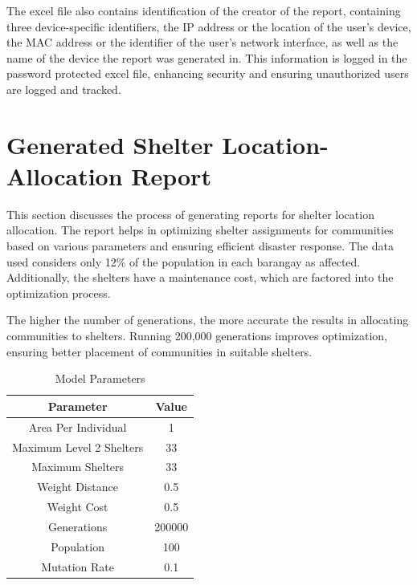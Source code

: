 	The excel file also contains identification of the creator of the report, containing three device-specific identifiers, the IP address or the location of the user’s device, the MAC address or the identifier of the user’s network interface, as well as the name of the device the report was generated in. This information is logged in the password protected excel file, enhancing security and ensuring unauthorized users are logged and tracked. 
	
\section{Generated Shelter Location-Allocation Report}
	This section discusses the process of generating reports for shelter location allocation. The report helps in optimizing shelter assignments for communities based on various parameters and ensuring efficient disaster response. The data used considers only 12\% of the population in each barangay as affected. Additionally, the shelters have a maintenance cost, which are factored into the optimization process.
	
	The higher the number of generations, the more accurate the results in allocating communities to shelters. Running 200,000 generations improves optimization, ensuring better placement of communities in suitable shelters.
	
	\begin{table}[h]
		\centering
		\caption{Model Parameters}
		\label{modelParams}
		\begin{tabular}{|c|c|}
			\hline
			\textbf{Parameter} & \textbf{Value} \\ \hline
			Area Per Individual & 1 \\ 
			Maximum Level 2 Shelters  & 33 \\ 
			Maximum Shelters & 33 \\ 
			Weight Distance & 0.5 \\ 
			Weight Cost & 0.5 \\ 
			Generations & 200000 \\ 
			Population & 100 \\ 
			Mutation Rate & 0.1 \\ \hline
		\end{tabular}
	\end{table}
	
